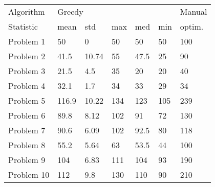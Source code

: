 \begin{tabular}{lllllll}
\toprule
Algorithm & \multicolumn{5}{l}{Greedy} & Manual \\
Statistic &   mean &    std &  max &   med &  min & optim. \\
\midrule
Problem 1  &     50 &      0 &   50 &    50 &   50 &    100 \\
Problem 2  &   41.5 &  10.74 &   55 &  47.5 &   25 &     90 \\
Problem 3  &   21.5 &    4.5 &   35 &    20 &   20 &     40 \\
Problem 4  &   32.1 &    1.7 &   34 &    33 &   29 &     34 \\
Problem 5  &  116.9 &  10.22 &  134 &   123 &  105 &    239 \\
Problem 6  &   89.8 &   8.12 &  102 &    91 &   72 &    130 \\
Problem 7  &   90.6 &   6.09 &  102 &  92.5 &   80 &    118 \\
Problem 8  &   55.2 &   5.64 &   63 &  53.5 &   44 &    100 \\
Problem 9  &    104 &   6.83 &  111 &   104 &   93 &    190 \\
Problem 10 &    112 &    9.8 &  130 &   110 &   90 &    210 \\
\bottomrule
\end{tabular}

